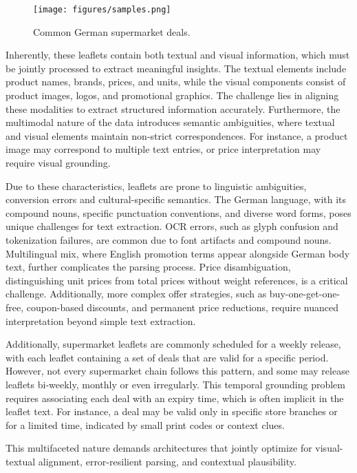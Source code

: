 \documentclass[11pt]{article}
\begin{document}
\begin{figure}[h!]
    \centering
    \texttt{[image: figures/samples.png]}
    \caption{Common German supermarket deals.}
    \label{fig:leaflet_data_samples}
\end{figure}

Inherently, these leaflets contain both textual and visual information, which must be jointly processed to extract meaningful insights. The textual elements include product names, brands, prices, and units, while the visual components consist of product images, logos, and promotional graphics. The challenge lies in aligning these modalities to extract structured information accurately. Furthermore, the multimodal nature of the data introduces semantic ambiguities, where textual and visual elements maintain non-strict correspondences. For instance, a product image may correspond to multiple text entries, or price interpretation may require visual grounding.

Due to these characteristics, leaflets are prone to linguistic ambiguities, conversion errors and cultural-specific semantics. The German language, with its compound nouns, specific punctuation conventions, and diverse word forms, poses unique challenges for text extraction. OCR errors, such as glyph confusion and tokenization failures, are common due to font artifacts and compound nouns. Multilingual mix, where English promotion terms appear alongside German body text, further complicates the parsing process. Price disambiguation, distinguishing unit prices from total prices without weight references, is a critical challenge. Additionally, more complex offer strategies, such as buy-one-get-one-free, coupon-based discounts, and permanent price reductions, require nuanced interpretation beyond simple text extraction.

Additionally, supermarket leaflets are commonly scheduled for a weekly release, with each leaflet containing a set of deals that are valid for a specific period. However, not every supermarket chain follows this pattern, and some may release leaflets bi-weekly, monthly or even irregularly. This temporal grounding problem requires associating each deal with an expiry time, which is often implicit in the leaflet text. For instance, a deal may be valid only in specific store branches or for a limited time, indicated by small print codes or context clues.

This multifaceted nature demands architectures that jointly optimize for visual-textual alignment, error-resilient parsing, and contextual plausibility. 
\end{document}
